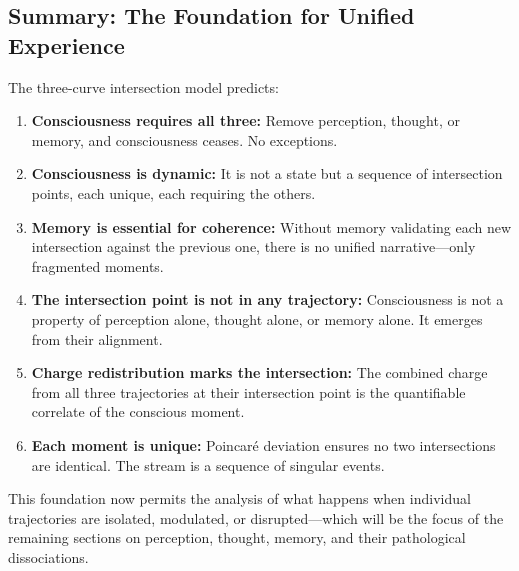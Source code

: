 \subsection{Summary: The Foundation for Unified Experience}

The three-curve intersection model predicts:

\begin{enumerate}[leftmargin=1.3em]
\item \textbf{Consciousness requires all three:} Remove perception, thought, or memory, and consciousness ceases. No exceptions.

\item \textbf{Consciousness is dynamic:} It is not a state but a sequence of intersection points, each unique, each requiring the others.

\item \textbf{Memory is essential for coherence:} Without memory validating each new intersection against the previous one, there is no unified narrative—only fragmented moments.

\item \textbf{The intersection point is not in any trajectory:} Consciousness is not a property of perception alone, thought alone, or memory alone. It emerges from their alignment.

\item \textbf{Charge redistribution marks the intersection:} The combined charge from all three trajectories at their intersection point is the quantifiable correlate of the conscious moment.

\item \textbf{Each moment is unique:} Poincaré deviation ensures no two intersections are identical. The stream is a sequence of singular events.

\end{enumerate}

This foundation now permits the analysis of what happens when individual trajectories are isolated, modulated, or disrupted—which will be the focus of the remaining sections on perception, thought, memory, and their pathological dissociations.